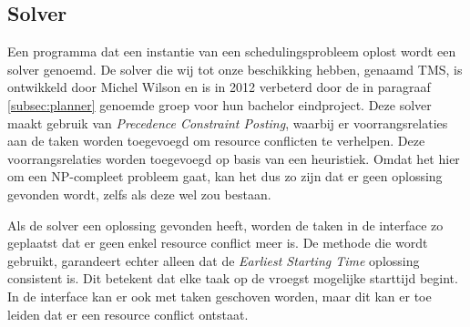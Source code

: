 \subsection{Solver}
\label{subsec:solver}

Een programma dat een instantie van een schedulingsprobleem oplost wordt een solver genoemd. De solver die wij tot onze beschikking hebben, genaamd TMS, is ontwikkeld door Michel Wilson en is in 2012 verbeterd door de in paragraaf \ref{subsec:planner} genoemde groep voor hun bachelor eindproject. Deze solver maakt gebruik van \emph{Precedence Constraint Posting}, waarbij er voorrangsrelaties aan de taken worden toegevoegd om resource conflicten te verhelpen. \cite{seminarium2014} Deze voorrangsrelaties worden toegevoegd op basis van een heuristiek. Omdat het hier om een NP-compleet probleem gaat, kan het dus zo zijn dat er geen oplossing gevonden wordt, zelfs als deze wel zou bestaan.

Als de solver een oplossing gevonden heeft, worden de taken in de interface zo geplaatst dat er geen enkel resource conflict meer is. De methode die wordt gebruikt, garandeert echter alleen dat de \emph{Earliest Starting Time} oplossing consistent is. Dit betekent dat elke taak op de vroegst mogelijke starttijd begint. In de interface kan er ook met taken geschoven worden, maar dit kan er toe leiden dat er een resource conflict ontstaat. 
